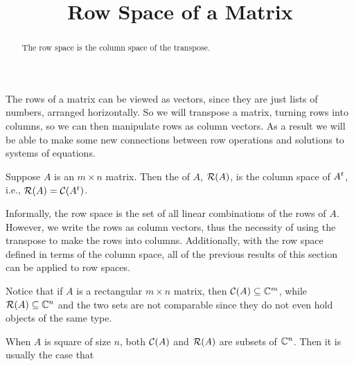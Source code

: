 \documentclass{ximera}
\title{Row Space of a Matrix}
\begin{document}
\begin{abstract}
  The row space is the column space of the transpose.
\end{abstract}
\maketitle

The rows of a matrix can be viewed as vectors, since they are just
lists of numbers, arranged horizontally.  So we will transpose a
matrix, turning rows into columns, so we can then manipulate rows as
column vectors.  As a result we will be able to make some new
connections between row operations and solutions to systems of
equations.

\begin{definition}
  Suppose $A$ is an $m\times n$ matrix.  Then the  of
  $A$, $\mathcal{R}\!\left(A\right)$, is the column space of $A^{t}$, i.e.,
  $\mathcal{R}\!\left(A\right)=\mathcal{C}\!\left(A^{t}\right)$.
\end{definition}

Informally, the row space is the set of all linear combinations of the
rows of $A$.  However, we write the rows as column vectors, thus the
necessity of using the transpose to make the rows into columns.
Additionally, with the row space defined in terms of the column space,
all of the previous results of this section can be applied to row
spaces.

Notice that if $A$ is a rectangular $m\times n$ matrix, then
$\mathcal{C}\!\left(A\right)\subseteq\mathbb{C}^{m}$, while $\mathcal{R}\!\left(A\right)\subseteq\mathbb{C}^{n}$ and
the two sets are not comparable since they do not even hold objects of
the same type.

\begin{question}
  When $A$ is square of size $n$, both $\mathcal{C}\!\left(A\right)$ and $\mathcal{R}\!\left(A\right)$ are
  subsets of $\mathbb{C}^{n}$.  Then it is usually the case that
  \begin{multipleChoice}
  \end{multipleChoice}
\end{question}
\end{document}

